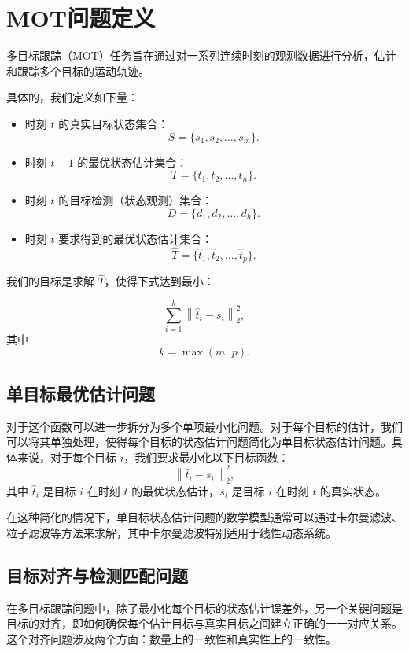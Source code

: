\documentclass{article}
\begin{document}
\section{MOT问题定义}

多目标跟踪（MOT）任务旨在通过对一系列连续时刻的观测数据进行分析，估计和跟踪多个目标的运动轨迹。

具体的，我们定义如下量：

\begin{itemize}
    \item 时刻 $t$ 的真实目标状态集合：
    \[
        S = \{ s_1, s_2, \ldots, s_m \}.
    \]

    \item 时刻 $t-1$ 的最优状态估计集合：
    \[
        T = \{ t_1, t_2, \ldots, t_n \}.
    \]

    \item 时刻 $t$ 的目标检测（状态观测）集合：
    \[
        D = \{ d_1, d_2, \ldots, d_h \}.
    \]

    \item 时刻 $t$ 要求得到的最优状态估计集合：
    \[
        \hat{T} = \{ \hat{t}_1, \hat{t}_2, \ldots, \hat{t}_p \}.
    \]
\end{itemize}

我们的目标是求解 $\hat{T}$，使得下式达到最小：

\[
    \sum_{i=1}^{k} \left\| \hat{t}_i - s_i \right\|_2^2,
\]
其中
\[
    k = \max(m,\, p).
\]

\subsection{单目标最优估计问题}

对于这个函数可以进一步拆分为多个单项最小化问题。对于每个目标的估计，我们可以将其单独处理，使得每个目标的状态估计问题简化为单目标状态估计问题。具体来说，对于每个目标 $i$，我们要求最小化以下目标函数：
\[
    \left\| \hat{t}_i - s_i \right\|_2^2,
\]
其中 $\hat{t}_i$ 是目标 $i$ 在时刻 $t$ 的最优状态估计，$s_i$ 是目标 $i$ 在时刻 $t$ 的真实状态。

在这种简化的情况下，单目标状态估计问题的数学模型通常可以通过卡尔曼滤波、粒子滤波等方法来求解，其中卡尔曼滤波特别适用于线性动态系统。

\subsection{目标对齐与检测匹配问题}
在多目标跟踪问题中，除了最小化每个目标的状态估计误差外，另一个关键问题是目标的对齐，即如何确保每个估计目标与真实目标之间建立正确的一一对应关系。这个对齐问题涉及两个方面：数量上的一致性和真实性上的一致性。
\end{document}

